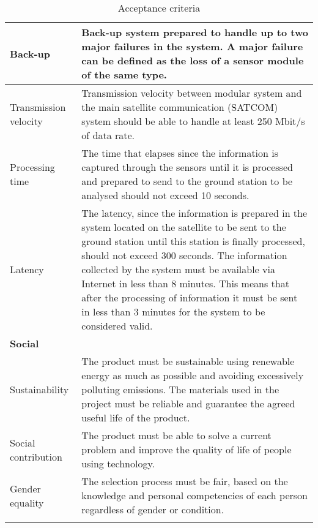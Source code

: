 \begin{longtable}[H]{lp{10.2cm}}
	\midrule	
	Back-up & Back-up system prepared to handle up to two major failures in the system. A major failure can be defined as the loss of a sensor module of the same type.\vspace{0.2cm} \\

	\midrule	
	Transmission velocity & Transmission velocity between modular system and the main satellite communication (SATCOM) system should be able to handle at least 250 Mbit/s of data rate.\vspace{0.2cm} \\

	\midrule	
	Processing time & The time that elapses since the information is captured through the sensors until it is processed and prepared to send to the ground station to be analysed should not exceed 10 seconds.\vspace{0.2cm} \\

	\midrule	
	Latency & The latency, since the information is prepared in the system located on the satellite to be sent to the ground station until this station is finally processed, should not exceed 300 seconds. The information collected by the system must be available via Internet in less than 8 minutes. This means that after the processing of information it must be sent in less than 3 minutes for the system to be considered valid.\vspace{0.2cm} \\

	\midrule		
	
	
	\textbf{Social} & \vspace{0.2cm} \\
	
	\midrule
		
	Sustainability & The product must be sustainable using renewable energy as much as possible and avoiding excessively polluting emissions. The materials used in the project must be reliable and guarantee the agreed useful life of the product.\vspace{0.2cm} \\
	
	\midrule		
	
	Social contribution & The product must be able to solve a current problem and improve the quality of life of people using technology.\vspace{0.2cm} \\
	
	\midrule
	
	Gender equality & The selection process must be fair, based on the knowledge and personal competencies of each person regardless of gender or condition.\vspace{0.2cm} \\

	
	\bottomrule[2pt]
	
	\caption{Acceptance criteria}
\end{longtable}